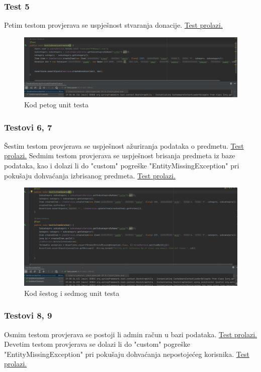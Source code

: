                 \subsubsection{Test 5}
                Petim testom provjerava se uspješnost stvaranja donacije. \underline{Test prolazi.}

                \begin{figure}[H]
				\includegraphics[]{slike/unit5.png}
				\centering
				\caption{Kod petog unit testa}
				\label{fig:unit5}
			\end{figure}

                \subsubsection{Testovi 6, 7}
                Šestim testom provjerava se uspješnost ažuriranja podataka o predmetu. \underline{Test prolazi.}
                Sedmim testom provjerava se uspješnost brisanja predmeta iz baze podataka, kao i dolazi li do "custom" pogreške "EntityMissingException" pri pokušaju dohvaćanja izbrisanog predmeta. \underline{Test prolazi.}

                \begin{figure}[H]
				\includegraphics[]{slike/unit6.png}
				\centering
				\caption{Kod šestog i sedmog unit testa}
				\label{fig:unit67}
			\end{figure}

                \subsubsection{Testovi 8, 9}
                Osmim testom provjerava se postoji li admin račun u bazi podataka. \underline{Test prolazi.}
                Devetim testom provjerava se dolazi li do "custom" pogreške "EntityMissingException" pri pokušaju dohvaćanja nepostojećeg korisnika. \underline{Test prolazi.}

